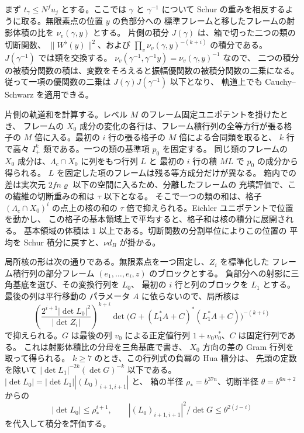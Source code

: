 まず \(t_\gamma\le N^fu_j\) とする。ここでは \(\gamma\) と \(\gamma^{-1}\) について
Schur の重みを相反するように取る。無限素点の位置 \(y\) の負部分への
標準フレームと移したフレームの射影体積の比を \(\nu_v(\gamma,y)\) とする。
片側の積分 \(J(\gamma)\) は、箱で切った二つの類の切断関数、
\(\|W^\flat(y)\|^2\)、および \(\prod_v\nu_v(\gamma,y)^{-(k+i)}\) の積分である。
\(J(\gamma^{-1})\) では類を交換する。
\(\nu_v(\gamma^{-1},\gamma^{-1}y)=\nu_v(\gamma,y)^{-1}\) なので、
二つの積分の被積分関数の積は、変数をそろえると振幅優関数の被積分関数の二乗になる。
従って一項の優関数の二乗は \(J(\gamma)J(\gamma^{-1})\) 以下となり、
軌道上でも Cauchy--Schwarz を適用できる。

片側の軌道和を計算する。レベル \(M\) のフレーム固定ユニポテントを掛けたとき、
フレームの \(X_0\) 成分の変化の各行は、フレーム積行列の全等方行が張る格子の
\(M\) 倍に入る。最初の \(i\) 行の張る格子の \(M\) 倍による合同類を取ると、
\(k\) 行で高々 \(I_+^k\) 類である。一つの類の基準項 \(p_0\) を固定する。
同じ類のフレームの \(X_0\) 成分は、\(\Lambda_c\cap X_0\) に列をもつ行列 \(L\) と
最初の \(i\) 行の積 \(ML\) で \(p_0\) の成分から得られる。
\(L\) を固定した項のフレームは残る等方成分だけが異なる。
箱内での差は実次元 \(2fn\varrho\) 以下の空間に入るため、分離したフレームの
充填評価で、この繊維の切断重みの和は \(\tau\) 以下となる。
そこで一つの類の和は、格子 \((\Lambda_c\cap X_0)^i\) の点上の核の和の
\(\tau\) 倍で抑えられる。Eichler ユニポテントで位置を動かし、
この格子の基本領域上で平均すると、格子和は核の積分に展開される。
基本領域の体積は \(1\) 以上である。切断関数の分割単位によりこの位置の
平均を Schur 積分に戻すと、\(\nu d_B\) が掛かる。

局所核の形は次の通りである。無限素点を一つ固定し、\(Z_i\) を標準化した
フレーム積行列の部分フレーム \((e_1,\ldots,e_i,z)\) のブロックとする。
負部分への射影に三角基底を選び、その変換行列を \(L_0\)、
最初の \(i\) 行と列のブロックを \(L_1\) とする。最後の列は平行移動の
パラメータ \(A\) に依らないので、局所核は
\[
 \left(\frac{2^{i+1}|\det L_0|^2}{|\det Z_i|}\right)^{k+i}
 \det\!\bigl(G+(L_1^*A+C)^*(L_1^*A+C)\bigr)^{-(k+i)}
\]
で抑えられる。\(G\) は最後の列 \(v_0\) による正定値行列
\(1+v_0v_0^*\)、\(C\) は固定行列である。
これは射影体積比の分母を三角基底で書き、
\(X_0\) 方向の差の Gram 行列を取って得られる。
\(k\ge7\) のとき、この行列式の負冪の Hua 積分は、
先頭の定数を除いて
\(|\det L_1|^{-2k}(\det G)^{-k}\) 以下である。
\(|\det L_0|=|\det L_1||(L_0)_{i+1,i+1}|\) と、
箱の半径 \(\rho_\ast=b^{37n}\)、切断半径 \(\theta=b^{6n+2}\) からの
\[
 |\det L_0|\le\rho_\ast^{i+1},\qquad
 |(L_0)_{i+1,i+1}|^2/\det G\le\theta^{2(j-i)}
\]
を代入して積分を評価する。

